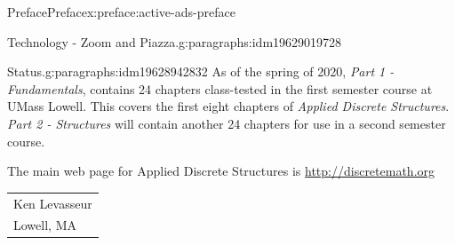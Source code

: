 \documentclass[oneside,10pt,]{book}
\numberwithin{equation}{section}
\begin{document}
\begin{preface}{Preface}{}{Preface}{}{}{x:preface:active-ads-preface}
\begin{paragraphs}{Technology - Zoom and Piazza.}{g:paragraphs:idm19629019728}
\end{paragraphs}%
\begin{paragraphs}{Status.}{g:paragraphs:idm19628942832}%
As of the spring of 2020, \emph{Part 1 - Fundamentals}, contains 24 chapters class-tested in the first semester course at UMass Lowell. This covers the first eight chapters of \emph{Applied Discrete Structures}. \emph{Part 2 - Structures} will contain another 24 chapters for use in a second semester course.%
\end{paragraphs}%
\par
The main web page for Applied Discrete Structures is \url{http://discretemath.org}%
\nopagebreak\par%
\hfill\begin{tabular}[t]{l@{}}
Ken Levasseur\\
Lowell, MA
\end{tabular}\\\par
\end{preface}
\setcounter{tocdepth}{0}
\renewcommand*\contentsname{Contents}
\tableofcontents
\mainmatter
%
%
\typeout{************************************************}
\typeout{************************************************}
%
\end{document}
